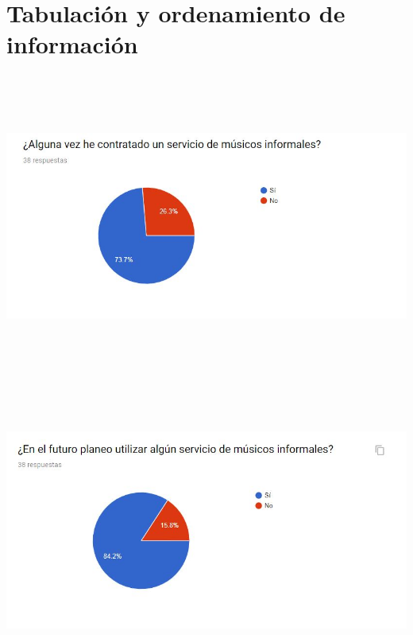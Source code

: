 \section{Tabulación y ordenamiento de información}

\begin{center}
\includegraphics[width=16cm, height=10cm,keepaspectratio=true]{Desarrollo/RecoleccionInformacion/imgs/1.JPG}
\includegraphics[width=16cm, height=10cm,keepaspectratio=true]{Desarrollo/RecoleccionInformacion/imgs/2.JPG}

\end{center}
